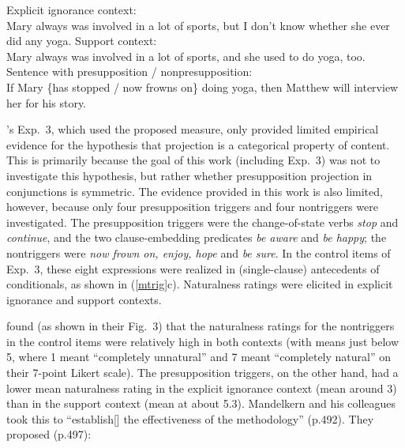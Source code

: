 \documentclass[11pt,fleqn]{article}
\newcommand{\6}{\mbox{$[\hspace*{-.6mm}[$}}
\newcommand{\9}{\mbox{$]\hspace*{-.6mm}]$}}
\newcommand{\citepos}[1]{\citeauthor{#1}'s \citeyear{#1}}
\begin{document}
\begin{exe}
\ex\label{mtrig} \citealt[490f.]{mandelkern-etal2020}
\begin{xlist}
\ex Explicit ignorance context: \\ Mary always was involved in a lot of sports, but I don't know whether she ever did any yoga.
\ex Support context: \\ Mary always was involved in a lot of sports, and she used to do yoga, too.
\ex Sentence with presupposition / nonpresupposition: \\ If Mary \{has stopped / now frowns on\} doing yoga, then Matthew will interview her for his story.
\end{xlist}
\end{exe}
\citepos{mandelkern-etal2020} Exp.~3, which used the proposed measure, only provided limited empirical evidence for the hypothesis that projection is a categorical property of content. This is primarily because the goal of this work (including Exp.~3) was not to investigate this hypothesis, but rather whether presupposition projection in conjunctions is symmetric. The evidence provided in this work is also limited, however, because only four presupposition triggers and four nontriggers were investigated. The presupposition triggers were the change-of-state verbs {\em stop} and {\em continue}, and the two clause-embedding predicates {\em be aware} and {\em be happy}; the nontriggers were {\em now frown on, enjoy, hope} and {\em be sure}.
%
In the control items of Exp.~3, these eight expressions were realized in (single-clause) antecedents of conditionals, as shown in (\ref{mtrig}c). Naturalness ratings were elicited in explicit ignorance and support contexts. 

\citealt{mandelkern-etal2020} found (as shown in their Fig.~3) that the naturalness ratings for the nontriggers in the control items were relatively high in both contexts (with means just below 5, where 1 meant ``completely unnatural'' and 7 meant ``completely natural'' on their 7-point Likert scale). The presupposition triggers, on the other hand, had a lower mean naturalness rating in the explicit ignorance context (mean around 3) than in the support context (mean at about 5.3). Mandelkern and his colleagues took this to ``establish[] the effectiveness of the methodology'' (p.492). They proposed (p.497):
\end{document}
